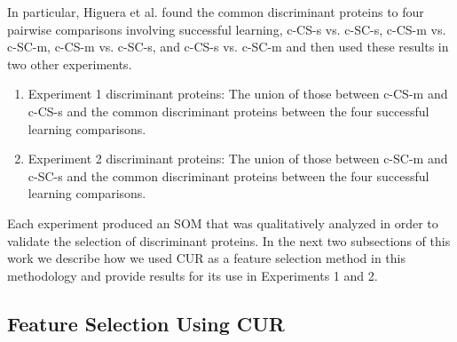 \documentclass[12pt]{article}
\begin{document}
In particular, Higuera et al. found the common discriminant proteins to four pairwise comparisons involving successful learning, c-CS-s vs. c-SC-s, c-CS-m vs. c-SC-m, c-CS-m vs. c-SC-s, and c-CS-s vs. c-SC-m and then used these results in two other experiments.
\begin{enumerate}
    \item Experiment 1 discriminant proteins: The union of those between c-CS-m and c-CS-s and the common discriminant proteins between the four successful learning comparisons.
    \item Experiment 2 discriminant proteins: The union of those between c-SC-m and c-SC-s and the common discriminant proteins between the four successful learning comparisons.
\end{enumerate}
Each experiment produced an SOM that was qualitatively analyzed in order to validate the selection of discriminant proteins.  In the next two subsections of this work we describe how we used CUR as a feature selection method in this methodology and provide results for its use in Experiments 1 and 2. 

\subsection{Feature Selection Using CUR}
\end{document}
